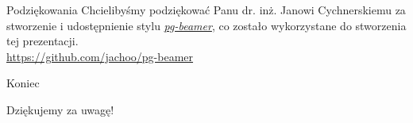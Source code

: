 \documentclass[polish,aspectratio=169]{beamer}
\begin{document}
\begin{frame}{Podziękowania}
    Chcielibyśmy podziękować Panu dr. inż. Janowi Cychnerskiemu za stworzenie 
    i udostępnienie stylu \href{https://github.com/jachoo/pg-beamer}{\emph{pg-beamer}}, 
    co zostało wykorzystane do stworzenia tej prezentacji.\\
    \url{https://github.com/jachoo/pg-beamer}
     
\end{frame}

\begin{frame}{Koniec}
    \begin{center}
        {\huge Dziękujemy za uwagę!}
    \end{center}
\end{frame}

\pglastframe


\end{document}
